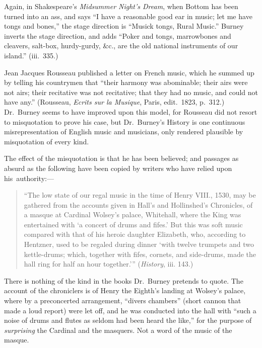 Again, in Shakespeare’s \textit{Midsummer Night’s Dream}, when Bottom has been
turned into an ass, and says “I have a reasonable good ear in music; let me have
tongs and bones,” the stage direction is “Musick tongs, Rural Music.” Burney
inverts the stage direction, and adds “Poker and tongs, marrowbones and cleavers,
salt-box, hurdy-gurdy, \&c., are the old national instruments of our island.”
(iii.~335.)

Jean Jacques Rousseau published a letter on French music, which he summed
up by telling his countrymen that “their harmony was abominable; their airs
were not airs; their recitative was not recitative; that they had no music, and
could not have any.” (Rousseau, \textit{Ecrits sur la Musique}, Paris, edit.~1823,
p.~312.) Dr.~Burney seems to have improved upon this model, for Rousseau did
not resort to misquotation to prove his case, but Dr.~Burney’s History is one
continuous misrepresentation of English music and musicians, only rendered
plausible by misquotation of every kind.

The effect of the misquotation is that he has been believed; and passages as
absurd as the following have been copied by writers who have relied upon his~authority:—

\begin{quotation}“The low state of our regal music in the time of Henry VIII., 1530, may be
gathered from the accounts given in Hall’s and Hollinshed’s Chronicles, of a masque
at Cardinal Wolsey’s palace, Whitehall, where the King was entertained with
‘a concert of drums and fifes.’ But this was soft music compared with that of
his heroic daughter Elizabeth, who, according to Hentzner, used to be regaled
during dinner ‘with twelve trumpets and two kettle-drums; which, together with
fifes, cornets, and side-drums, made the hall ring for half an hour together.’”
(\textit{History}, iii. 143.)
\end{quotation}

 
There is nothing of the kind in the 
books Dr.~Burney pretends to quote. The 
account of the chroniclers is of \pagebreak
Henry the Eighth’s landing at Wolsey’s palace, 
where by a preconcerted arrangement, “divers chambers” (short cannon that 
made a loud report) were let off, and he was conducted into the hall with “such
a noise of drums and flutes as seldom had been heard the like,” for the purpose
of \textit{surprising} the Cardinal and the masquers. Not a word of the music of the
masque.




